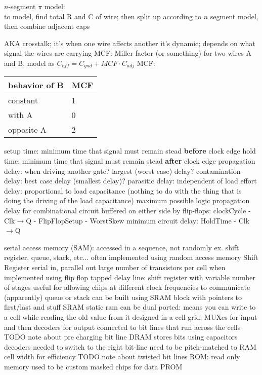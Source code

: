 \documentclass[12pt]{article}
\begin{document}
\begin{spacing}{0.8}
\begin{multicols*}{2}
\begin{flushleft}
\begin{outline}[longenum]

  \1 $n$-segment $\pi$ model:
  \\ to model, find total R and C of wire; then split up according to $n$ segment model, then combine adjacent caps

  \1 AKA crosstalk; it's when one wire affects another
  \1 it's dynamic; depends on what signal the wires are carrying
  \1 MCF: Miller factor (or something)
  \1 for two wires A and B, model as $C_{eff} = C_{gnd} + MCF \cdot C_{adj}$
  \1 MCF: \begin{tabular}{l|l}
  behavior of B & MCF \\ \hline
  constant   & 1 \\
  with A     & 0 \\
  opposite A & 2 \\
  \end{tabular}

  \1 setup time: minimum time that signal must remain stead \textbf{before} clock edge
  \1 hold time:  minimum time that signal must remain stead \textbf{after}  clock edge
  \1 propagation delay: when driving another gate? largest (worst case) delay?
  \1 contamination delay: best case delay (smallest delay)?
  \1 parasitic delay: independent of load
  \1 effort delay: proportional to load capacitance (nothing to do with the thing that is doing the driving of the load capacitance)
  \1 maximum possible logic propagation delay for combinational circuit buffered on either side by flip-flops:
    clockCycle - Clk$\rightarrow$Q - FlipFlopSetup - WorstSkew
    \2 minimum circuit delay: HoldTime - Clk$\rightarrow$Q

  \1 serial access memory (SAM): accessed in a sequence, not randomly
    \2 ex. shift register, queue, stack, etc...
    \2 often implemented using random access memory
  \1 Shift Register
    \2 serial in, parallel out
    \2 large number of transistors per cell when implemented using flip flop
    \2 tapped delay line: shift register with variable number of stages
      \3 useful for allowing chips at different clock frequencies to communicate (apparently)
  \1 queue or stack can be built using SRAM block with pointers to first/last and stuff
  \1 SRAM
    \2 static ram
    \2 can be dual ported: means you can write to a cell while reading the old value from it
    \2 designed in a cell grid, MUXes for input and then decoders for output connected to bit lines that run across the cells
    \2 TODO note about pre charging bit line
  \1 DRAM
    \2 stores bits using capacitors
  \1 decoders
    \2 needed to switch to the right bit-line
    \2 need to be pitch-matched to RAM cell width for efficiency
    \2 TODO note about twisted bit lines
  \1 ROM: read only memory
    \2 used to be custom masked chips for data
    \2 
  \1 PROM



\end{outline}
\end{flushleft}
\end{multicols*}
\end{spacing}
\end{document}

